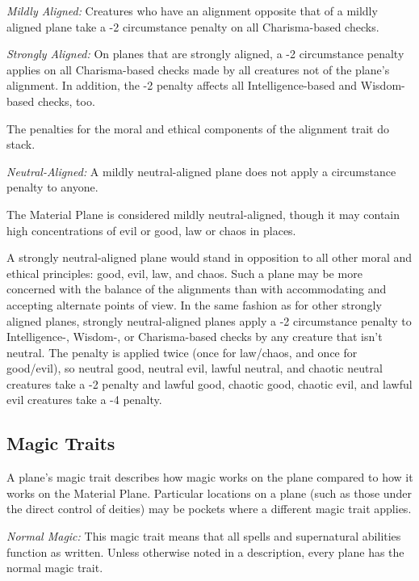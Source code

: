\documentclass{article}
\begin{document}
\textit{Mildly Aligned: }Creatures who have an alignment opposite that of a mildly 
aligned plane take a -2 circumstance penalty on all Charisma-based checks.

\textit{Strongly Aligned:} On planes that are strongly aligned, a -2 circumstance 
penalty applies on all Charisma-based checks made by all creatures not of the plane's 
alignment. In addition, the -2 penalty affects all Intelligence-based and Wisdom-based 
checks, too.

The penalties for the moral and ethical components of the alignment trait do stack.

\vspace{12pt}
\textit{Neutral-Aligned:} A mildly neutral-aligned plane does not apply a circumstance 
penalty to anyone.

The Material Plane is considered mildly neutral-aligned, though it may contain 
high concentrations of evil or good, law or chaos in places.

A strongly neutral-aligned plane would stand in opposition to all other moral and 
ethical principles: good, evil, law, and chaos. Such a plane may be more concerned 
with the balance of the alignments than with accommodating and accepting alternate 
points of view. In the same fashion as for other strongly aligned planes, strongly 
neutral-aligned planes apply a -2 circumstance penalty to Intelligence-, Wisdom-, 
or Charisma-based checks by any creature that isn't neutral. The penalty is applied 
twice (once for law/chaos, and once for good/evil), so neutral good, neutral evil, 
lawful neutral, and chaotic neutral creatures take a -2 penalty and lawful good, 
chaotic good, chaotic evil, and lawful evil creatures take a -4 penalty.

\vspace{12pt}
\subsection*{Magic Traits}

A plane's magic trait describes how magic works on the plane compared to how it 
works on the Material Plane. Particular locations on a plane (such as those under 
the direct control of deities) may be pockets where a different magic trait applies.

\textit{Normal Magic:} This magic trait means that all spells and supernatural 
abilities function as written. Unless otherwise noted in a description, every plane 
has the normal magic trait.
\end{document}
